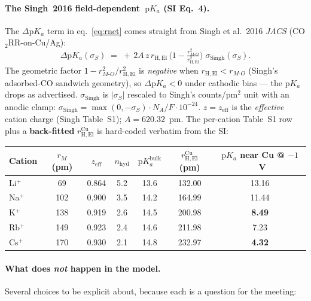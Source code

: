\documentclass[11pt]{article}
\begin{document}
\paragraph{The Singh~2016 field-dependent~$\mathrm{p}K_a$ (SI Eq.~4).}
The $\Delta\mathrm{p}K_a$ term in eq.~\eqref{eq:rnet} comes
straight from Singh et al.\ 2016 \emph{JACS} (CO$_2$RR-on-Cu/Ag):
\[
  \Delta\mathrm{p}K_a(\sigma_S)
  \;=\;
  +\,2 A\,z\,r_{\mathrm{H,El}}\,
   \Big(1 - \tfrac{r_{M\text{-}O}^2}{r_{\mathrm{H,El}}^2}\Big)\;
   \sigma_{\mathrm{Singh}}(\sigma_S).
\]
The geometric factor $1-r_{M\text{-}O}^2/r_{\mathrm{H,El}}^2$ is
\emph{negative} when $r_{\mathrm{H,El}}<r_{M\text{-}O}$ (Singh's
adsorbed-CO sandwich geometry), so $\Delta\mathrm{p}K_a<0$ under
cathodic bias --- the p$K_a$ drops as advertised.
$\sigma_{\mathrm{Singh}}$ is $|\sigma_S|$ rescaled to Singh's
counts/pm$^2$ unit with an anodic clamp:
$\sigma_{\mathrm{Singh}}=\max(0, -\sigma_S)\cdot N_A/F \cdot 10^{-24}$.
$z=z_{\mathrm{eff}}$ is the \emph{effective} cation charge (Singh
Table~S1); $A=620.32$~pm.  The per-cation Table~S1 row plus a
\textbf{back-fitted} $r_{\mathrm{H,El}}^{\mathrm{Cu}}$ is hard-coded
verbatim from the SI:

\begin{center}\footnotesize
\begin{tabular}{lcccccc}
\toprule
Cation & $r_M$ (pm) & $z_{\mathrm{eff}}$ & $n_{\mathrm{hyd}}$ & $\mathrm{p}K_a^{\mathrm{bulk}}$ & $r_{\mathrm{H,El}}^{\mathrm{Cu}}$ (pm) & $\mathrm{p}K_a$ near Cu @ $-1$~V \\
\midrule
Li$^+$ &  69  & 0.864 & 5.2 & 13.6 & 132.00 & 13.16 \\
Na$^+$ & 102  & 0.900 & 3.5 & 14.2 & 164.99 & 11.44 \\
K$^+$  & 138  & 0.919 & 2.6 & 14.5 & 200.98 &  \textbf{8.49} \\
Rb$^+$ & 149  & 0.923 & 2.4 & 14.6 & 211.98 &  7.23 \\
Cs$^+$ & 170  & 0.930 & 2.1 & 14.8 & 232.97 &  \textbf{4.32} \\
\bottomrule
\end{tabular}
\end{center}

\paragraph{What does \emph{not} happen in the model.}
Several choices to be explicit about, because each is a question for
the meeting:
\end{document}
